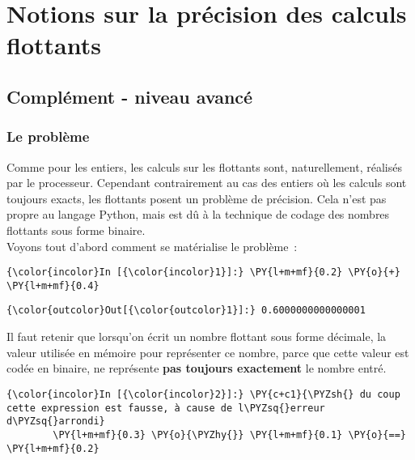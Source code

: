     \hypertarget{notions-sur-la-pruxe9cision-des-calculs-flottants}{%
\section{Notions sur la précision des calculs
flottants}\label{notions-sur-la-pruxe9cision-des-calculs-flottants}}

    \hypertarget{compluxe9ment---niveau-avancuxe9}{%
\subsection{Complément - niveau
avancé}\label{compluxe9ment---niveau-avancuxe9}}

    \hypertarget{le-probluxe8me}{%
\subsubsection{Le problème}\label{le-probluxe8me}}

    Comme pour les entiers, les calculs sur les flottants sont,
naturellement, réalisés par le processeur. Cependant contrairement au
cas des entiers où les calculs sont toujours exacts, les flottants
posent un problème de précision. Cela n'est pas propre au langage
Python, mais est dû à la technique de codage des nombres flottants sous
forme binaire.\\

    Voyons tout d'abord comment se matérialise le problème~:

    \begin{Verbatim}[commandchars=\\\{\}]
{\color{incolor}In [{\color{incolor}1}]:} \PY{l+m+mf}{0.2} \PY{o}{+} \PY{l+m+mf}{0.4}
\end{Verbatim}


\begin{Verbatim}[commandchars=\\\{\}]
{\color{outcolor}Out[{\color{outcolor}1}]:} 0.6000000000000001
\end{Verbatim}
            
    Il faut retenir que lorsqu'on écrit un nombre flottant sous forme
décimale, la valeur utilisée en mémoire pour représenter ce nombre,
parce que cette valeur est codée en binaire, ne représente \textbf{pas
toujours exactement} le nombre entré.

    \begin{Verbatim}[commandchars=\\\{\}]
{\color{incolor}In [{\color{incolor}2}]:} \PY{c+c1}{\PYZsh{} du coup cette expression est fausse, à cause de l\PYZsq{}erreur d\PYZsq{}arrondi}
        \PY{l+m+mf}{0.3} \PY{o}{\PYZhy{}} \PY{l+m+mf}{0.1} \PY{o}{==} \PY{l+m+mf}{0.2}
\end{Verbatim}



